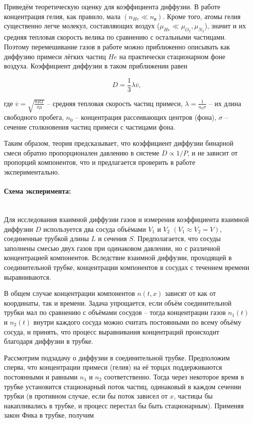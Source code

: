 \documentclass[a4paper, 12pt]{article}
\newcommand{\parag}[1]{\paragraph*{#1:}}
\begin{document}
Приведём теоретическую оценку для коэффициента диффузии. В работе концентрация гелия, как правило, мала $ (n_{He} \ll n_\text{в}) $. Кроме того, атомы гелия существенно легче молекул, составляющих воздух ($ \mu_{He} \ll \mu_{O_2}, \mu_{N_2} $), значит и их средняя тепловая скорость велика по сравнению с остальными частицами. Поэтому перемешивание газов в работе можно приближенно описывать как диффузию примеси лёгких частиц $ He $ на практически стационарном фоне воздуха. Коэффициент диффузии в таком приближении равен

\begin{equation}\label{2}
D=\frac{1}{3}\lambda \overline{v},
\end{equation}

где $ \overline{v}=\sqrt{\frac{8RT}{\pi \mu}} $ -- средняя тепловая скорость частиц примеси, $ \lambda = \frac{1}{n_0\sigma} $ -- их длина свободного пробега, $ n_0 $ -- концентрация рассеивающих центров (фона), $ \sigma $ -- сечение столкновения частиц примеси с частицами фона.

Таким образом, теория предсказывает, что коэффициент диффузии бинарной смеси обратно пропорционален давлению в системе $ D \propto 1/P $, и не зависит от пропорций компонентов, что и предлагается проверить в работе экспериментально.

\parag {Схема эксперимента}~\\

Для исследования взаимной диффузии газов и измерения коэффициента взаимной диффузии $ D $ используется два сосуда объёмами $ V_1 $ и $ V_2 $ $ (V_1\approx V_2=V) $, соединенные трубкой длины $ L $ и сечения $ S $. Предполагается, что сосуды заполнены смесью двух газов при одинаковом давлении, но с различной концентрацией компонентов. Вследствие взаимной диффузии, проходящей в соединительной трубке, концентрации компонентов в сосудах с течением времени выравниваются. 

В общем случае концентрации компонентов $ n(t, x) $ зависят от как от координаты, так и времени. Задача упрощается, если объём соединительной трубки мал по сравнению с объёмами сосудов -- тогда концентрации газов $ n_1(t) $ и $ n_2(t) $ внутри каждого сосуда можно считать постоянными по всему объёму сосуда, и принять, что процесс выравнивания концентраций происходит благодаря диффузии в трубке.

Рассмотрим подзадачу о диффузии в соединительной трубке. Предположим сперва, что концентрации примеси (гелия) на её торцах поддерживаются постоянными и равными $ n_1 $ и $ n_2 $ соответственно. Тогда через некоторое время в трубке установится стационарный поток частиц, одинаковый в каждом сечении трубки (в противном случае, если бы поток зависел от $ x $, частицы бы накапливались в трубке, и процесс перестал бы быть стационарным). Применяя закон Фика в трубке, получим
\end{document}
